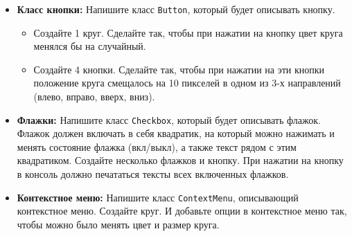 \documentclass{article}
\begin{document}
\begin{itemize}
\item \textbf{Класс кнопки:}  Напишите класс \texttt{Button}, который будет описывать кнопку. 
\begin{itemize}
\item Создайте 1 круг. Сделайте так, чтобы при нажатии на кнопку цвет круга менялся бы на случайный.
\item Создайте 4 кнопки. Сделайте так, чтобы при нажатии на эти кнопки положение круга смещалось на 10 пикселей в одном из 3-х направлений (влево, вправо, вверх, вниз).
\end{itemize}
	
\item \textbf{Флажки:} Напишите класс \texttt{Checkbox}, который будет описывать флажок. Флажок должен включать в себя квадратик, на который можно нажимать и менять состояние флажка (вкл/выкл), а также текст рядом с этим квадратиком. Создайте несколько флажков и кнопку. При нажатии на кнопку в консоль должно печататься тексты всех включенных флажков.

\item \textbf{Контекстное меню:} Напишите класс \texttt{ContextMenu}, описывающий контекстное меню.
Создайте круг. И добавьте опции в контекстное меню так, чтобы можно было менять цвет и размер круга.
\end{itemize}
\end{document}
